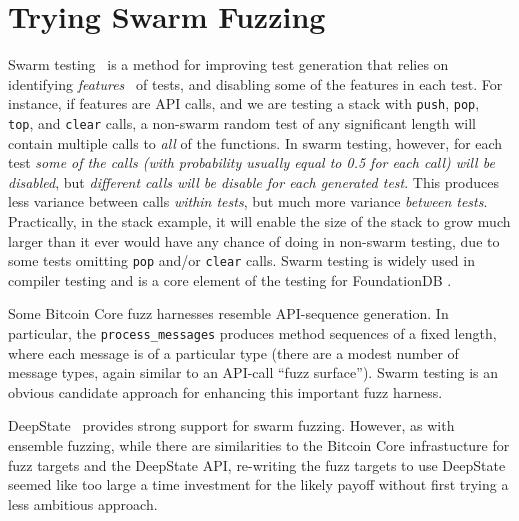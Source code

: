 \section{Trying Swarm Fuzzing}

Swarm testing~\cite{ISSTA12} is a method for improving test
generation that relies on identifying \emph{features}~\cite{groce2013help} of tests, and
disabling some of the features in each test.  For instance, if features are
API calls, and we are testing a stack with {\tt push}, {\tt pop}, {\tt
  top}, and {\tt clear} calls, a non-swarm random test of any
significant length will contain multiple calls to \emph{all} of
the functions.  In swarm testing, however, for each test \emph{some of the calls
(with probability usually equal to 0.5 for each call) will be
disabled}, but \emph{different calls will be disable for each generated
test}.  This produces less variance between calls \emph{within tests}, but
much more variance \emph{between tests}.  Practically, in the stack
example, it will enable the size of the stack to grow much larger than
it ever would have any chance of doing in non-swarm testing, due to
some tests omitting {\tt pop} and/or {\tt clear} calls.  Swarm testing
is widely used in compiler testing
\cite{le2014compiler} and is a core element of the
testing for FoundationDB \cite{zhou2021foundationdb}.

Some Bitcoin Core fuzz harnesses resemble API-sequence generation.  In particular, the {\tt process\_messages} produces method sequences of a fixed length, where each message is of a particular type (there are a modest number of message types, again similar to an API-call ``fuzz surface'').  Swarm testing is an obvious candidate approach for enhancing this important fuzz harness.

DeepState~\cite{goodman2018deepstate} provides strong support for swarm fuzzing.  However, as with ensemble fuzzing, while there are similarities to the Bitcoin Core infrastucture for fuzz targets and the DeepState API, re-writing the fuzz targets to use DeepState seemed like too large a time investment for the likely payoff without first trying a less ambitious approach.

